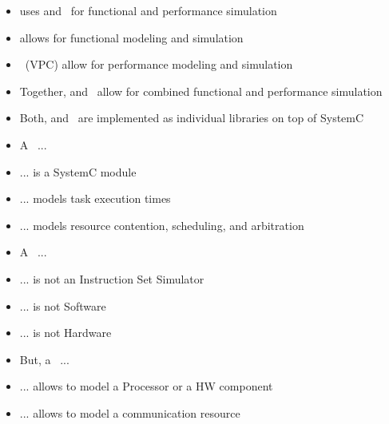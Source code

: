 \begin{frame}[t]
\begin{itemize}
\item \SystemCoDesigner{} uses \SysteMoC{} and \VPC\ for functional and performance simulation
\end{itemize}
\begin{itemize}
\item \SysteMoC{} allows for functional modeling and simulation
\end{itemize}

\begin{itemize}
\item \VPC\ (VPC) allow for performance modeling and simulation
\end{itemize}

\begin{itemize}
\item Together, \SysteMoC{} and \VPC\, allow for combined functional and performance simulation
\end{itemize}

\begin{itemize}
\item Both, \SysteMoC{} and \VPC\, are implemented as individual libraries on top of SystemC
\end{itemize}

\end{frame}


\begin{frame}[t]
\begin{itemize}
\item A \VPC\ ...
\item ... is a SystemC module
\item ... models task execution times
\item ... models resource contention, scheduling, and arbitration
\end{itemize}

\begin{itemize}
\item A \VPC\ ...
\item ... is not an Instruction Set Simulator
\item ... is not Software
\item ... is not Hardware
\end{itemize}

\begin{itemize}
\item But, a \VPC\ ...
\item ... allows to model a Processor or a HW component
\item ... allows to model a communication resource
\end{itemize}

\end{frame}



